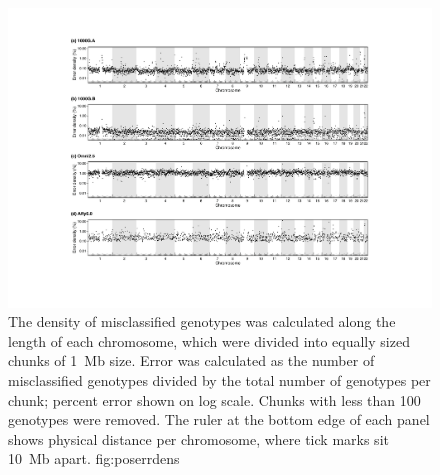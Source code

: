 

\begin{figure}[tbp]
\includegraphics[width=\textwidth]{./img/ch4/poserrdens}
%
{The density of misclassified genotypes was calculated along the length of each chromosome, which were divided into equally sized chunks of 1~Mb size.
Error was calculated as the number of misclassified genotypes divided by the total number of genotypes per chunk; percent error shown on log scale.
Chunks with less than 100 genotypes were removed.
The ruler at the bottom edge of each panel shows physical distance per chromosome, where tick marks sit 10~Mb apart.}%
{fig:poserrdens}
\end{figure}
